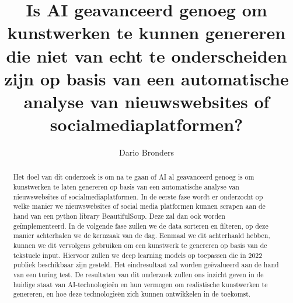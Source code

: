 \documentclass{hogent-article}
\title{Is AI geavanceerd genoeg om kunstwerken te kunnen genereren die niet van echt te onderscheiden zijn op basis van een automatische analyse van nieuwswebsites of socialmediaplatformen?}
\author{Dario Bronders}
\begin{document}
\begin{abstract}
  Het doel van dit onderzoek is om na te gaan of AI al geavanceerd genoeg is om kunstwerken te laten genereren op basis van een automatische analyse van nieuwswebsites of socialmediaplatformen. In de eerste fase wordt er onderzocht  op welke manier we nieuwswebsites of social media platformen kunnen scrapen aan de hand van een python library BeautifulSoup. Deze zal dan ook worden geïmplementeerd. In de volgende fase zullen we de data sorteren en filteren, op deze manier achterhalen we de kernzaak van de dag. Eenmaal we dit achterhaald hebben, kunnen we dit vervolgens gebruiken om een kunstwerk te genereren op basis van de tekstuele input. Hiervoor zullen we deep learning models op toepassen die in 2022 publiek beschikbaar zijn gesteld. Het eindresultaat zal worden geëvalueerd aan de hand van een turing test. De resultaten van dit onderzoek zullen ons inzicht geven in de huidige staat van AI-technologieën en hun vermogen om realistische kunstwerken te genereren, en hoe deze technologieën zich kunnen ontwikkelen in de toekomst.
\end{abstract}

\tableofcontents



\printbibliography[heading=bibintoc]
\end{document}

